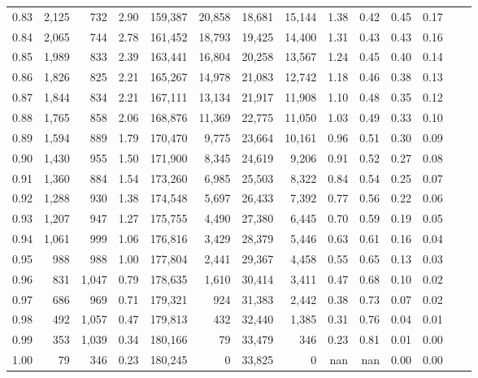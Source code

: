 \begin{tabular}{rrrrrrrrrrrrrr}
0.83 &  2,125 &    732 &    2.90 &  159,387 &   20,858 &  18,681 &  15,144 &  1.38 &  0.42 &  0.45 &      0.17 \\
0.84 &  2,065 &    744 &    2.78 &  161,452 &   18,793 &  19,425 &  14,400 &  1.31 &  0.43 &  0.43 &      0.16 \\
0.85 &  1,989 &    833 &    2.39 &  163,441 &   16,804 &  20,258 &  13,567 &  1.24 &  0.45 &  0.40 &      0.14 \\
0.86 &  1,826 &    825 &    2.21 &  165,267 &   14,978 &  21,083 &  12,742 &  1.18 &  0.46 &  0.38 &      0.13 \\
0.87 &  1,844 &    834 &    2.21 &  167,111 &   13,134 &  21,917 &  11,908 &  1.10 &  0.48 &  0.35 &      0.12 \\
0.88 &  1,765 &    858 &    2.06 &  168,876 &   11,369 &  22,775 &  11,050 &  1.03 &  0.49 &  0.33 &      0.10 \\
0.89 &  1,594 &    889 &    1.79 &  170,470 &    9,775 &  23,664 &  10,161 &  0.96 &  0.51 &  0.30 &      0.09 \\
0.90 &  1,430 &    955 &    1.50 &  171,900 &    8,345 &  24,619 &   9,206 &  0.91 &  0.52 &  0.27 &      0.08 \\
0.91 &  1,360 &    884 &    1.54 &  173,260 &    6,985 &  25,503 &   8,322 &  0.84 &  0.54 &  0.25 &      0.07 \\
0.92 &  1,288 &    930 &    1.38 &  174,548 &    5,697 &  26,433 &   7,392 &  0.77 &  0.56 &  0.22 &      0.06 \\
0.93 &  1,207 &    947 &    1.27 &  175,755 &    4,490 &  27,380 &   6,445 &  0.70 &  0.59 &  0.19 &      0.05 \\
0.94 &  1,061 &    999 &    1.06 &  176,816 &    3,429 &  28,379 &   5,446 &  0.63 &  0.61 &  0.16 &      0.04 \\
0.95 &    988 &    988 &    1.00 &  177,804 &    2,441 &  29,367 &   4,458 &  0.55 &  0.65 &  0.13 &      0.03 \\
0.96 &    831 &  1,047 &    0.79 &  178,635 &    1,610 &  30,414 &   3,411 &  0.47 &  0.68 &  0.10 &      0.02 \\
0.97 &    686 &    969 &    0.71 &  179,321 &      924 &  31,383 &   2,442 &  0.38 &  0.73 &  0.07 &      0.02 \\
0.98 &    492 &  1,057 &    0.47 &  179,813 &      432 &  32,440 &   1,385 &  0.31 &  0.76 &  0.04 &      0.01 \\
0.99 &    353 &  1,039 &    0.34 &  180,166 &       79 &  33,479 &     346 &  0.23 &  0.81 &  0.01 &      0.00 \\
1.00 &     79 &    346 &    0.23 &  180,245 &        0 &  33,825 &       0 &   nan &   nan &  0.00 &      0.00 \\
\bottomrule
\end{tabular}

